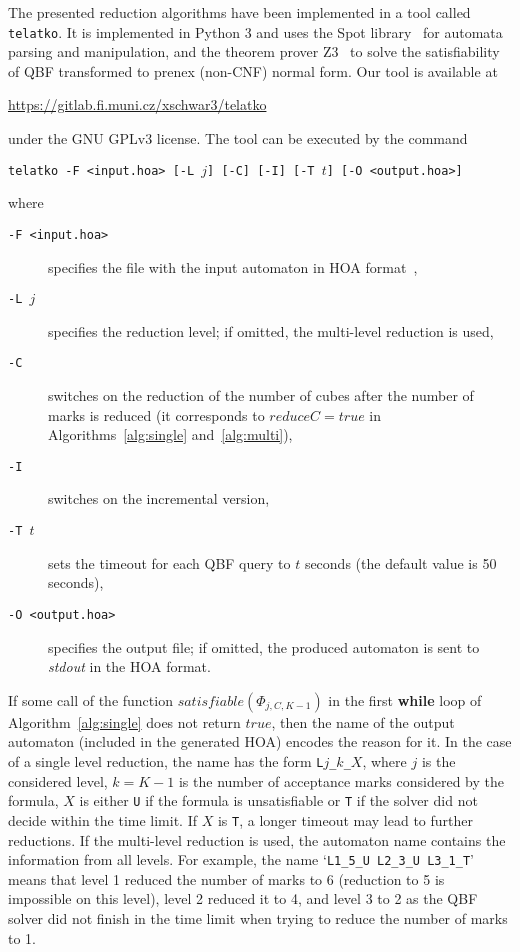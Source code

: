 \documentclass[a4paper,UKenglish,cleveref,autoref,thm-restate]{lipics-v2021}
\def\true{\mathit{true}}
\newcommand{\telatko}{\texttt{telatko}\xspace}
\begin{document}
The presented reduction algorithms have been implemented in a tool
called \telatko. It is implemented in Python 3 and uses the Spot
library~\cite{duret.16.atva2} for automata parsing and manipulation,
and the theorem prover Z3~\cite{demoura.08.tacas} to solve the
satisfiability of QBF transformed to prenex (non-CNF) normal form. Our
tool is available at
\begin{center}
\url{https://gitlab.fi.muni.cz/xschwar3/telatko}
\end{center}
under the GNU GPLv3
license. The tool can be executed by the command 
\begin{center}
  \texttt{telatko -F <input.hoa> [-L }$j$\texttt{] [-C] [-I] [-T }$t$\texttt{] [-O <output.hoa>]}
\end{center}
where
\begin{description}
\item[\texttt{-F <input.hoa>}] specifies the file with the input automaton in HOA format~\cite{babiak.15.cav}, 
\item[\texttt{-L }$j$] specifies the reduction level; if omitted, the multi-level reduction is used,
\item[\texttt{-C}] switches on the reduction of the number of cubes
  after the number of marks is reduced (it corresponds to
  $\mathit{reduceC}=\true$ in Algorithms~\ref{alg:single}
  and~\ref{alg:multi}),
\item[\texttt{-I}] switches on the incremental version,
\item[\texttt{-T }$t$] sets the timeout for each QBF query to $t$ seconds (the default value is 50 seconds), 
\item[\texttt{-O <output.hoa>}] specifies the output file; if omitted,
  the produced automaton is sent to \textit{stdout} in the HOA format.
\end{description}

If some call of the function $\mathit{satisfiable}(\Phi_{j,C,K{-}1})$
in the first \textbf{while} loop of Algorithm~\ref{alg:single} does
not return $\true$, then the name of the output automaton (included in
the generated HOA) encodes the reason for it. In the case of a single
level reduction, the name has the form \texttt{L$j$\_$k$\_$X$}, where
$j$ is the considered level, $k=K-1$ is the number of acceptance marks
considered by the formula, $X$ is either \texttt{U} if the formula is
unsatisfiable or \texttt{T} if the solver did not decide within the
time limit. If $X$ is \texttt{T}, a longer timeout may lead to further
reductions. If the multi-level reduction is used, the automaton name
contains the information from all levels. For example, the name
`\texttt{L1\_5\_U L2\_3\_U L3\_1\_T}' means that level 1 reduced the
number of marks to 6 (reduction to 5 is impossible on this level),
level 2 reduced it to 4, and level 3 to 2 as the QBF solver did not
finish in the time limit when trying to reduce the number of marks to
1.%
\end{document}
